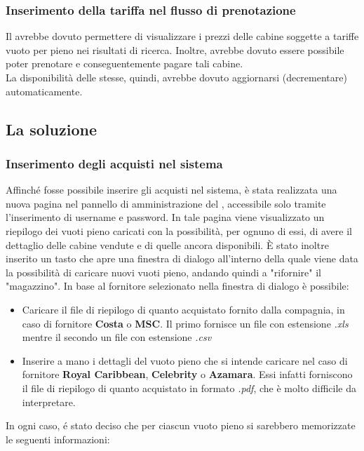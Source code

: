 \subsubsection{Inserimento della tariffa nel flusso di prenotazione}
Il \bookingEngine avrebbe dovuto permettere di visualizzare i prezzi delle cabine soggette a tariffe vuoto per pieno nei risultati di ricerca. Inoltre, avrebbe dovuto essere possibile poter prenotare e conseguentemente pagare tali cabine.\\La disponibilità delle stesse, quindi, avrebbe dovuto aggiornarsi (decrementare) automaticamente.

\subsection{La soluzione}
\subsubsection{Inserimento degli acquisti nel sistema}
Affinché fosse possibile inserire gli acquisti nel sistema, è stata realizzata una nuova pagina nel pannello di amministrazione del \bookingEngine, accessibile solo tramite l'inserimento di username e password. In tale pagina viene visualizzato un riepilogo dei vuoti pieno caricati con la possibilità, per ognuno di essi, di avere il dettaglio delle cabine vendute e di quelle ancora disponibili. È stato inoltre inserito un tasto che apre una finestra di dialogo all'interno della quale viene data la possibilità di caricare nuovi vuoti pieno, andando quindi a "rifornire" il "magazzino". In base al fornitore selezionato nella finestra di dialogo è possibile: 
\begin{itemize}
	\item Caricare il file di riepilogo di quanto acquistato fornito dalla compagnia, in caso di fornitore \textbf{Costa} o \textbf{MSC}. Il primo fornisce un file con estensione \textit{.xls} mentre il secondo un file con estensione \textit{.csv}
	\item Inserire a mano i dettagli del vuoto pieno che si intende caricare nel caso di fornitore \textbf{Royal Caribbean}, \textbf{Celebrity} o \textbf{Azamara}. Essi infatti forniscono il file di riepilogo di quanto acquistato in formato \textit{.pdf}, che è molto difficile da interpretare.
\end{itemize}
In ogni caso, é stato deciso che per ciascun vuoto pieno si sarebbero memorizzate le seguenti informazioni:
